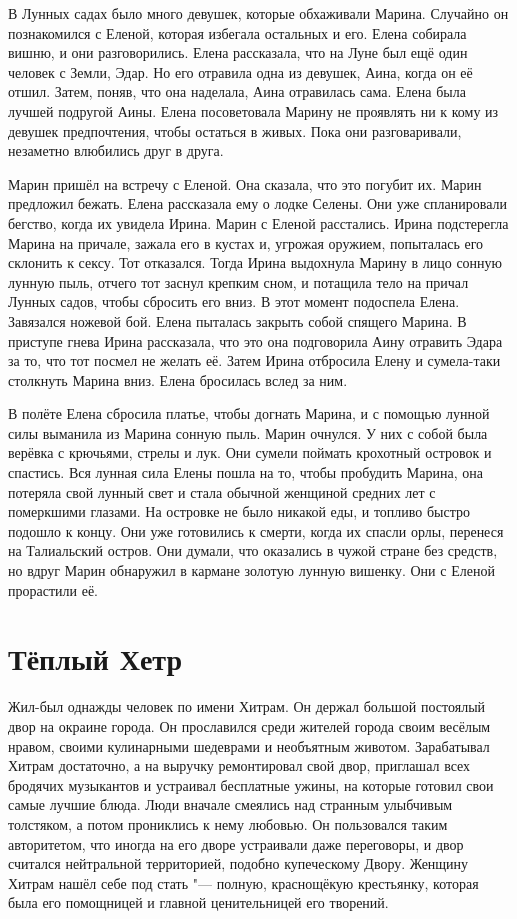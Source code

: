 В Лунных садах было много девушек, которые обхаживали Марина.
Случайно он познакомился с Еленой, которая избегала остальных и его.
Елена собирала вишню, и они разговорились.
Елена рассказала, что на Луне был ещё один человек с Земли, Эдар.
Но его отравила одна из девушек, Аина, когда он её отшил.
Затем, поняв, что она наделала, Аина отравилась сама.
Елена была лучшей подругой Аины.
Елена посоветовала Марину не проявлять ни к кому из девушек предпочтения, чтобы остаться в живых.
Пока они разговаривали, незаметно влюбились друг в друга.

Марин пришёл на встречу с Еленой.
Она сказала, что это погубит их.
Марин предложил бежать.
Елена рассказала ему о лодке Селены.
Они уже спланировали бегство, когда их увидела Ирина.
Марин с Еленой расстались.
Ирина подстерегла Марина на причале, зажала его в кустах и, угрожая оружием, попыталась его склонить к сексу.
Тот отказался.
Тогда Ирина выдохнула Марину в лицо сонную лунную пыль, отчего тот заснул крепким сном, и потащила тело на причал Лунных садов, чтобы сбросить его вниз.
В этот момент подоспела Елена.
Завязался ножевой бой.
Елена пыталась закрыть собой спящего Марина.
В приступе гнева Ирина рассказала, что это она подговорила Аину отравить Эдара за то, что тот посмел не желать её.
Затем Ирина отбросила Елену и сумела-таки столкнуть Марина вниз.
Елена бросилась вслед за ним.

В полёте Елена сбросила платье, чтобы догнать Марина, и с помощью лунной силы выманила из Марина сонную пыль.
Марин очнулся.
У них с собой была верёвка с крючьями, стрелы и лук.
Они сумели поймать крохотный островок и спастись.
Вся лунная сила Елены пошла на то, чтобы пробудить Марина, она потеряла свой лунный свет и стала обычной женщиной средних лет с померкшими глазами.
На островке не было никакой еды, и топливо быстро подошло к концу.
Они уже готовились к смерти, когда их спасли орлы, перенеся на Талиальский остров.
Они думали, что оказались в чужой стране без средств, но вдруг Марин обнаружил в кармане золотую лунную вишенку.
Они с Еленой прорастили её.

\section{Тёплый Хетр}

Жил-был однажды человек по имени Хитрам.
Он держал большой постоялый двор на окраине города.
Он прославился среди жителей города своим весёлым нравом, своими кулинарными шедеврами и необъятным животом.
Зарабатывал Хитрам достаточно, а на выручку ремонтировал свой двор, приглашал всех бродячих музыкантов и устраивал бесплатные ужины, на которые готовил свои самые лучшие блюда.
Люди вначале смеялись над странным улыбчивым толстяком, а потом прониклись к нему любовью.
Он пользовался таким авторитетом, что иногда на его дворе устраивали даже переговоры, и двор считался нейтральной территорией, подобно купеческому Двору.
Женщину Хитрам нашёл себе под стать "--- полную, краснощёкую крестьянку, которая была его помощницей и главной ценительницей его творений.

